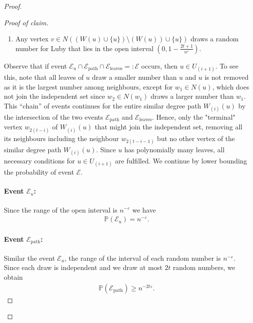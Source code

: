 \documentclass[letterpaper,11pt]{article}
\newcommand{\Pro}[1]{\mathbb{P}\left(#1\right)}
\newcommand{\eps}{\varepsilon}
\newcommand{\1}{\mathbb I}
\begin{document}
\begin{proof}
{\begin{proof}[Proof of claim]
\begin{enumerate}
\item[($\mathcal{E}_{\text{leaves}}$)] Any vertex $v \in N((W(u) \cup \{u\}) \setminus (W(u)) \cup \{u\})$  draws a random number for Luby that lies in the open interval $(0, 1- \frac{2t + 1}{n^\eps})$.   
\end{enumerate}
%
Observe that if event $\mathcal{E}_u \cap \mathcal{E}_{\text{path}} \cap \mathcal{E}_{\text{leaves}} =: \mathcal{E}$ occurs, then $u \in U_{(i+1)}$. To see this, note that all leaves of $u$ draw a smaller number than $u$ and $u$ is not removed as it is the largest number among neighbours, except for $w_1 \in N(u)$, which does not join the independent set since $w_2 \in N(w_1)$ draws a larger number than $w_1$. This ``chain'' of events continues for the entire similar degree path $W_{(i)}(u)$ by the intersection of the two events $\mathcal{E}_{\text{path}}$ and $\mathcal{E}_{\text{leaves}}$. Hence, only the "terminal" vertex $w_{2(t-i)}$ of $W_{(i)}(u)$ that might join the independent set, removing all its neighbours including the neighbour $w_{2(t-i-1)}$ but no other vertex of the similar degree path $W_{(i)}(u)$. Since $u$ has polynomially many leaves, all necessary conditions for $u \in U_{(i+1)}$ are fulfilled. We continue by lower bounding the probability of event $\mathcal{E}$.

\paragraph{Event $\mathcal{E}_u$:} Since the range of the open interval is $n^{-\eps}$ we have
%
\begin{align}\label{eq:randomdraw1}
    \Pro{\mathcal{E}_u} = n^{-\eps}.
\end{align}
%
\paragraph{Event $\mathcal{E}_{\text{path}}$:} Similar the event $\mathcal{E}_u$, the range of the interval of each random number is $n^{-\eps}$. Since each draw is independent and we draw at most $2t$ random numbers, we obtain
%
\begin{align}\label{eq:randomdraw2}
    \Pro{\mathcal{E}_{\text{path}}} \geq n^{-2t\eps}.
\end{align}
%

\end{proof}}
\end{proof}
\end{document}

